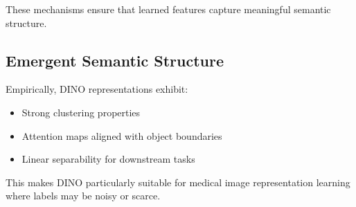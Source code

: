 These mechanisms ensure that learned features capture meaningful semantic structure.

\subsection{Emergent Semantic Structure}

Empirically, DINO representations exhibit:

\begin{itemize}
    \item Strong clustering properties
    \item Attention maps aligned with object boundaries
    \item Linear separability for downstream tasks
\end{itemize}

This makes DINO particularly suitable for medical image representation learning where labels may be noisy or scarce.